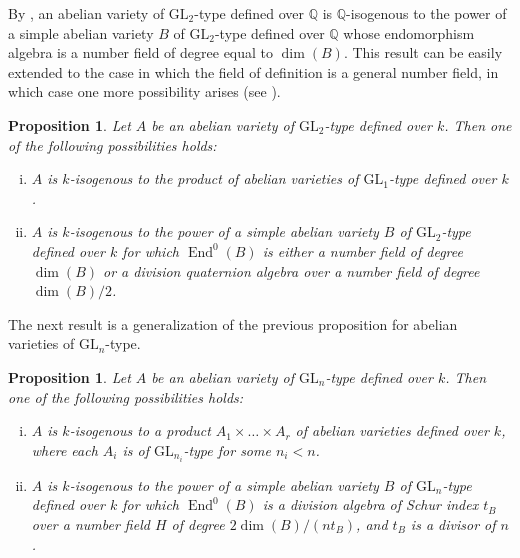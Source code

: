 \documentclass[oneside]{amsart}
\newtheorem{proposition}[theorem]{Proposition}
\theoremstyle{remark}
\newcommand{\Q}{\mathbb Q}
\newcommand{\GL}{\mathrm{GL}}
\newcommand{\End}{\operatorname{End}}
\numberwithin{equation}{section}
\begin{document}
By \cite[Prop. 2.1]{Rib92}, an abelian variety of $\GL_2$-type defined over $\Q$ is $\Q$-isogenous to the power of a simple abelian variety $B$ of $\GL_2$-type defined over $\Q$ whose endomorphism algebra is a number field of degree equal to $\dim(B)$. This result can be easily extended to the case in which the field of definition is a general number field, in which case one more possibility arises (see \cite[Prop. 1.5]{Shim72}). 

\begin{proposition}\label{proposition: noliterat} 
Let $A$ be an abelian variety of $\GL_2$-type defined over $k$. Then one of the following possibilities holds:
\begin{enumerate}[i)]
\item $A$ is $k$-isogenous to the product of abelian varieties of $\GL_1$-type defined over $k$.
\item $A$ is $k$-isogenous to the power of a simple abelian variety $B$ of $\GL_2$-type defined over $k$ for which $\End^0(B)$ is either a number field of degree $\dim(B)$ or a division quaternion algebra over a number field of degree $\dim(B)/2$.
\end{enumerate}
\end{proposition}

The next result is a generalization of the previous proposition for abelian varieties of $\GL_n$-type.
 
\begin{proposition}\label{proposition: deck}
Let $A$ be an abelian variety of $\GL_n$-type defined over $k$. Then one of the following possibilities holds:
\begin{enumerate}[i)]
\item $A$ is $k$-isogenous to a product $A_1\times \dots \times A_r$ of abelian varieties defined over $k$, where each $A_i$ is of $\GL_{n_i}$-type for some $n_i<n$.
\item $A$ is $k$-isogenous to the power of a simple abelian variety $B$ of $\GL_n$-type defined over $k$ for which $\End^0(B)$ is a division algebra of Schur index $t_B$ over a number field $H$ of degree $2\dim(B)/(nt_B)$, and $t_B$ is a divisor of $n$.
\end{enumerate}
\end{proposition}
\end{document}
